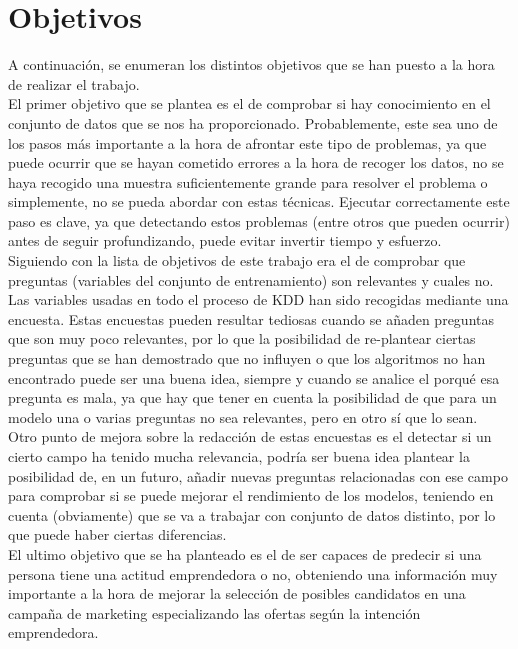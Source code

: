 \section{Objetivos}
\label{sec:obj}
A continuación, se enumeran los distintos objetivos que se han puesto a la hora de realizar el trabajo. \\
\linebreak
El primer objetivo que se plantea es el de comprobar si hay conocimiento en el conjunto de datos que se nos ha proporcionado. Probablemente, este sea uno de los pasos más importante a la hora de afrontar este tipo de problemas, ya que puede ocurrir que se hayan cometido errores a la hora de recoger los datos, no se haya recogido una muestra suficientemente grande para resolver el problema o simplemente, no se pueda abordar con estas técnicas. Ejecutar correctamente este paso es clave, ya que detectando estos problemas (entre otros que pueden ocurrir) antes de seguir profundizando, puede evitar invertir tiempo y esfuerzo.\\
\linebreak
Siguiendo con la lista de objetivos de este trabajo era el de comprobar que preguntas (variables del conjunto de entrenamiento) son relevantes y cuales no. Las variables usadas en todo el proceso de KDD han sido recogidas mediante una encuesta. Estas encuestas pueden resultar tediosas cuando se añaden preguntas que son muy poco relevantes, por lo que la posibilidad de re-plantear ciertas preguntas que se han demostrado que no influyen o que los algoritmos no han encontrado puede ser una buena idea, siempre y cuando se analice el porqué esa pregunta es mala, ya que hay que tener en cuenta la posibilidad de que para un modelo una o varias preguntas no sea relevantes, pero en otro  sí que lo sean.\\
\linebreak
Otro punto de mejora sobre la redacción de estas encuestas es el detectar si un cierto campo ha tenido mucha relevancia, podría ser buena idea plantear la posibilidad de, en un futuro, añadir nuevas preguntas relacionadas con ese campo para comprobar si se puede mejorar el rendimiento de los modelos, teniendo en cuenta (obviamente) que se va a trabajar con conjunto de datos distinto, por lo que puede haber ciertas diferencias.\\
\linebreak
El ultimo objetivo que se ha planteado es el de ser capaces de predecir si una persona tiene una actitud emprendedora o no, obteniendo una información muy importante a la hora de mejorar la selección de posibles candidatos en una campaña de marketing especializando las ofertas según la intención emprendedora. 
